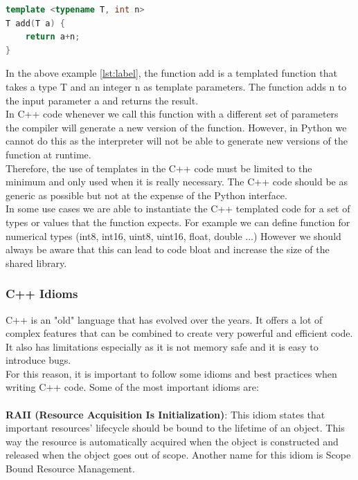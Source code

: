 \begin{spacing}{1.2}
    \begin{lstlisting}[language=C++,caption={Example of a Templated Function},label={lst:label}]
template <typename T, int n>
T add(T a) {
    return a+n;
}
    \end{lstlisting}

    In the above example \ref{lst:label}, the function add is a templated function that takes
    a type T and an integer n as template parameters. The function adds n to the input parameter
    a and returns the result.\\

    In C++ code whenever we call this function with a different set of parameters
    the compiler will generate a new version of the function. However, in Python we cannot do
    this as the interpreter will not be able to generate new versions of the function at runtime.\\

    Therefore, the use of templates in the C++ code must be limited to the minimum and only used
    when it is really necessary. The C++ code should be as generic as possible but not at the
    expense of the Python interface.\\

    In some use cases we are able to instantiate the C++ templated code for a set of types or values
    that the function expects. For example we can define function for numerical types (int8, int16, uint8, uint16, float, double ...)
    However we should always be aware that this can lead to code bloat and increase the size
    of the shared library.\\





    \subsubsection{C++ Idioms}
    C++ is an "old" language that has evolved over the years. It offers a lot of complex
    features that can be combined to create very powerful and efficient code. It also has limitations
    especially as it is not memory safe and it is easy to introduce bugs.\\

    For this reason, it is important to follow some idioms and best practices when writing C++ code.
    Some of the most important idioms are:\\ \\
    \textbf{RAII (Resource Acquisition Is Initialization)}:
    This idiom states that important resources' lifecycle should be bound to the lifetime of
    an object. This way the resource is automatically acquired when the object is constructed and
    released when the object goes out of scope. Another name for this idiom is
    Scope Bound Resource Management.\\


\end{spacing}

